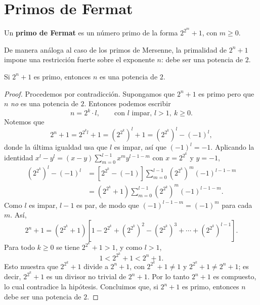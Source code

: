 \documentclass[12pt,a4paper]{book}
\begin{document}
  \section{Primos de Fermat}
  
  \begin{definicion}
    Un \textbf{primo de Fermat} es un número primo de la forma $2^{2^m}+1$, con $m\geq 0$.
  \end{definicion}
  
  De manera análoga al caso de los primos de Mersenne, la primalidad de $2^n+1$ impone una restricción fuerte sobre el exponente $n$: debe ser una potencia de $2$.
  
  \begin{teorema}
    Si $2^n+1$ es primo, entonces $n$ es una potencia de $2$.
  \end{teorema}
  
  \begin{proof}
    Procedemos por contradicción. Supongamos que $2^n+1$ es primo pero que $n$ \emph{no} es una potencia de $2$. Entonces podemos escribir
    \begin{equation*}
      n = 2^k \cdot l, \qquad \text{con } l \text{ impar, } l>1,\ k\geq 0.
    \end{equation*}
    Notemos que
    \begin{equation*}
      2^n+1 = 2^{2^k l}+1 = \left(2^{2^k}\right)^l+1 = \left(2^{2^k}\right)^l-(-1)^l,
    \end{equation*}
    donde la última igualdad usa que $l$ es impar, así que $(-1)^l=-1$. Aplicando la identidad $x^l-y^l=(x-y)\sum_{m=0}^{l-1}x^my^{l-1-m}$ con $x=2^{2^k}$ y $y=-1$,
    \begin{align*}
      \left(2^{2^k}\right)^l-(-1)^l
      & = \left[2^{2^k}-(-1)\right]\sum_{m=0}^{l-1}\left(2^{2^k}\right)^m(-1)^{l-1-m} \\
      & = \left(2^{2^k}+1\right)\sum_{m=0}^{l-1}\left(2^{2^k}\right)^m(-1)^{l-1-m}.
    \end{align*}
    Como $l$ es impar, $l-1$ es par, de modo que $(-1)^{l-1-m}=(-1)^m$ para cada $m$. Así,
    \begin{equation*}
      2^n+1 = \left(2^{2^k}+1\right)\left[1-2^{2^k}+\left(2^{2^k}\right)^2-\left(2^{2^k}\right)^3+\cdots+\left(2^{2^k}\right)^{l-1}\right].
    \end{equation*}
    Para todo $k\geq 0$ se tiene $2^{2^k}+1>1$, y como $l>1$,
    \begin{equation*}
      1<2^{2^k}+1<2^n+1.
    \end{equation*}
    Esto muestra que $2^{2^k}+1$ divide a $2^n+1$, con $2^{2^k}+1\neq 1$ y $2^{2^k}+1\neq 2^n+1$; es decir, $2^{2^k}+1$ es un divisor no trivial de $2^n+1$. Por lo tanto $2^n+1$ es compuesto, lo cual contradice la hipótesis. Concluimos que, si $2^n+1$ es primo, entonces $n$ debe ser una potencia de $2$.
  \end{proof}
  
\end{document}
